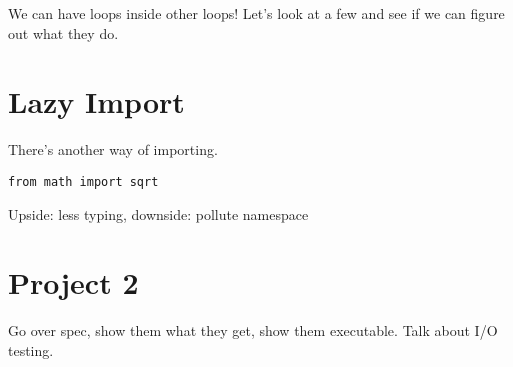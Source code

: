 \documentclass[12pt]{article}
\begin{document}
We can have loops inside other loops!  Let's look at a few and see if we can
figure out what they do.

\section*{Lazy Import}

There's another way of importing.

\begin{lstlisting}
from math import sqrt
\end{lstlisting}

\noindent
Upside: less typing, downside: pollute namespace

\section*{Project 2}

Go over spec, show them what they get, show them executable.  Talk about I/O
testing.
\end{document}
